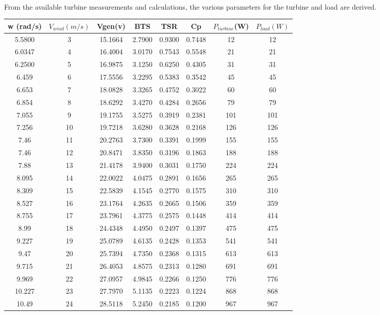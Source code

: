\documentclass[titlepage]{article}
\begin{document}
\paragraph{}From the available turbine measurements and calculations, the various parameters for the turbine and load are derived.
\begin{table}[h!]
\centering
\begin{tabular}{ |c|c|c|c|c|c|c|c| } 
 \hline
w (rad/s) & $V_{wind}(m/s)$ & Vgen(v) & BTS & TSR & Cp & $P_{turbine}$(W)& $P_{load}(W)$\\
\hline
5.5800& 3&  15.1664&    2.7900& 0.9300& 0.7448& 12&     12\\
6.0347&	4&	16.4004&	3.0170&	0.7543&	0.5548&	21&	    21\\
6.2500& 5&	16.9875&	3.1250&	0.6250&	0.4305& 31&	    31\\
6.459&	6&	17.5556&	3.2295&	0.5383&	0.3542&	45&	    45\\
6.653&	7&	18.0828&	3.3265&	0.4752&	0.3022&	60&	    60\\
6.854&	8&	18.6292&	3.4270&	0.4284&	0.2656&	79&	    79\\
7.055&	9&	19.1755&	3.5275&	0.3919&	0.2381&	101&	101\\
7.256&	10&	19.7218&	3.6280&	0.3628&	0.2168&	126&	126\\
7.46&	11&	20.2763&	3.7300&	0.3391&	0.1999&	155&	155\\
7.46&	12&	20.8471&	3.8350&	0.3196&	0.1863&	188&	188\\
7.88&	13&	21.4178&	3.9400&	0.3031&	0.1750&	224&    224\\
8.095&	14&	22.0022&	4.0475&	0.2891&	0.1656&	265&    265\\
8.309&	15&	22.5839&	4.1545&	0.2770& 0.1575&	310&	310\\
8.527&	16&	23.1764&	4.2635&	0.2665&	0.1506&	359&	359\\
8.755&	17&	23.7961&	4.3775&	0.2575&	0.1448&	414&	414\\
8.99&	18&	24.4348&	4.4950&	0.2497&	0.1397&	475&	475\\
9.227&	19&	25.0789&	4.6135&	0.2428&	0.1353&	541&	541\\
9.47&	20&	25.7394&	4.7350&	0.2368&	0.1315&	613&	613\\
9.715&	21&	26.4053&	4.8575&	0.2313&	0.1280&	691&	691\\
9.969&	22&	27.0957&	4.9845&	0.2266&	0.1250&	776&	776\\
10.227&	23&	27.7970&	5.1135&	0.2223&	0.1224&	868&	868\\
10.49&	24&	28.5118&	5.2450&	0.2185&	0.1200&	967&	967\\

\end{tabular}
\end{table}
\end{document}

